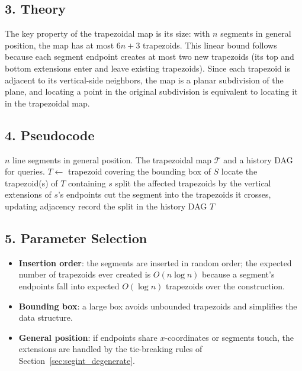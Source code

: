 \subsection{3. Theory}

The key property of the trapezoidal map is its size: with $n$ segments in
general position, the map has at most $6n + 3$ trapezoids. This linear
bound follows because each segment endpoint creates at most two new
trapezoids (its top and bottom extensions enter and leave existing
trapezoids). Since each trapezoid is adjacent to its vertical-side
neighbors, the map is a planar subdivision of the plane, and locating a
point in the original subdivision is equivalent to locating it in the
trapezoidal map.

\subsection{4. Pseudocode}

\begin{algorithm}[htbp]
\caption{Build the Trapezoidal Map of a Segment Set}
\label{alg:pointloc_trapezoidal}
\begin{algorithmic}[1]
\Require $n$ line segments in general position.
\Ensure The trapezoidal map $\mathcal{T}$ and a history DAG for queries.
  \State $T \gets$ trapezoid covering the bounding box of $S$
    \State locate the trapezoid(s) of $T$ containing $s$
    \State split the affected trapezoids by the vertical extensions of $s$'s endpoints
    \State cut the segment into the trapezoids it crosses, updating adjacency
    \State record the split in the history DAG
  \EndFor
  \State \Return $T$
\EndFunction
\end{algorithmic}
\end{algorithm}

\subsection{5. Parameter Selection}

\begin{itemize}
\item \textbf{Insertion order}: the segments are inserted in random order;
  the expected number of trapezoids ever created is $O(n \log n)$ because a
  segment's endpoints fall into expected $O(\log n)$ trapezoids over the
  construction.
\item \textbf{Bounding box}: a large box avoids unbounded trapezoids and
  simplifies the data structure.
\item \textbf{General position}: if endpoints share $x$-coordinates or
  segments touch, the extensions are handled by the tie-breaking rules of
  Section~\ref{sec:segint_degenerate}.
\end{itemize}

